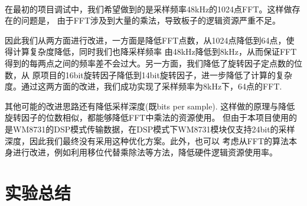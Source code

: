 \documentclass[12pt]{article}
\begin{document}
\paragraph{}在最初的项目调试中，我们希望做到的是采样频率48kHz的1024点FFT。这样做存在的问题是，
由于FFT涉及到大量的乘法，导致板子的逻辑资源严重不足。

因此我们从两方面进行改进，一方面是降低FFT点数，从1024点降低到64点，使得计算复杂度降低，同时我们也降采样频率
由48kHz降低到8kHz，从而保证FFT得到的每两点之间的频率差不会过大。另一方面，我们降低了旋转因子定点数的位数，从
原项目的16bit旋转因子降低到14bit旋转因子，进一步降低了计算的复杂度。通过这两方面的改进，我们成功实现了采样频率为8kHz下，64点的FFT.

其他可能的改进思路还有降低采样深度(既bits per sample). 这样做的原理与降低旋转因子的位数相似，都能够降低FFT中乘法的资源使用。
但由于本项目使用的是WM8731的DSP模式传输数据，在DSP模式下WM8731模块仅支持24bit的采样深度，因此我们最终没有采用这种优化方案。此外，也可以
考虑从FFT的算法本身进行改进，例如利用移位代替乘除法等方法，降低硬件逻辑资源使用率。

\section{实验总结}
\end{document}
